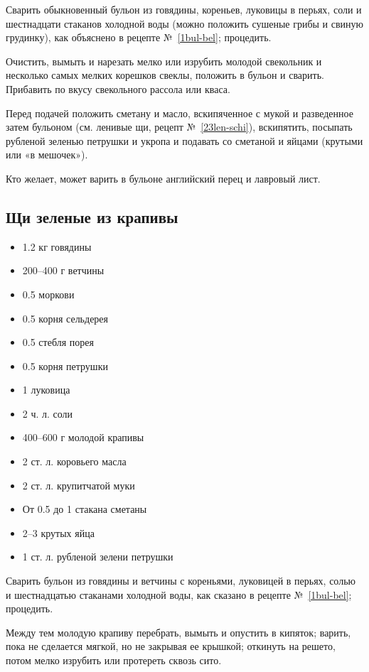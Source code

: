 Сварить обыкновенный бульон из говядины, кореньев, луковицы в перьях, соли и шестнадцати стаканов холодной воды (можно положить сушеные грибы и свиную грудинку), как объяснено в рецепте №~\ref{1bul-bel}; процедить.

Очистить, вымыть и нарезать мелко или изрубить молодой свекольник и несколько самых мелких корешков свеклы, положить в бульон и сварить. Прибавить по вкусу свекольного рассола или кваса.

Перед подачей положить сметану и масло, вскипяченное с мукой и разведенное затем бульоном (см. ленивые щи, рецепт №~\ref{23len-schi}), вскипятить, посыпать рубленой зеленью петрушки и укропа и подавать со сметаной и яйцами (крутыми или «в мешочек»).

Кто желает, может варить в бульоне английский перец и лавровый лист.

\subsection{Щи зеленые из крапивы}\label{25schi-krap}

\begin{itemize}
	\item 1.2 кг говядины 
	\item 200–400 г ветчины 
	\item 0.5 моркови 
	\item 0.5 корня сельдерея 
	\item 0.5 стебля порея 
	\item 0.5 корня петрушки 
	\item 1 луковица 
	\item 2 ч. л. соли 
	\item 400–600 г молодой крапивы 
	\item 2 ст. л. коровьего масла 
	\item 2 ст. л. крупитчатой муки 
	\item От 0.5 до 1 стакана сметаны 
	\item 2–3 крутых яйца 
	\item 1 ст. л. рубленой зелени петрушки
\end{itemize}

Сварить бульон из говядины и ветчины с кореньями, луковицей в перьях, солью и шестнадцатью стаканами холодной воды, как сказано в рецепте №~\ref{1bul-bel}; процедить.

Между тем молодую крапиву перебрать, вымыть и опустить в кипяток; варить, пока не сделается мягкой, но не закрывая ее крышкой; откинуть на решето, потом мелко изрубить или протереть сквозь сито.

